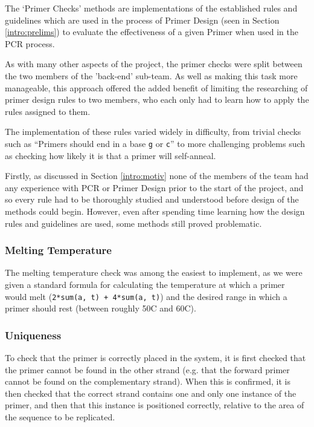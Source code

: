 The `Primer Checks' methods are implementations of the established rules
and guidelines which are used in the process of Primer Design (seen in
Section \ref{intro:prelims}) to evaluate the effectiveness of a given 
Primer when used in the PCR process.

As with many other aspects of the project, the primer checks were split
between the two members of the 'back-end' sub-team. As well as making
this task more manageable, this approach offered the added benefit of
limiting the researching of primer design rules to two members, who each
only had to learn how to apply the rules assigned to them.

The implementation of these rules varied widely in difficulty, from
trivial checks such as ``Primers should end in a base \verb£g£ or \verb£c£'' 
to more challenging problems such as checking how likely it is that a primer  
will self-anneal.

Firstly, as discussed in Section \ref{intro:motiv} none of the members of 
the team had any experience with PCR or Primer Design prior to the start of 
the project, and so every rule had to be thoroughly studied and understood 
before design of the methods could begin. However, even after spending time 
learning how the design rules and guidelines are used, some methods still 
proved problematic.

\subsubsection{Melting Temperature}
The melting temperature check was among the easiest to implement, as we
were given a standard formula for calculating the temperature at which a 
primer would melt (\texttt{2*sum(a, t) + 4*sum(a, t)}) and the desired 
range in which a primer should rest (between roughly 50\degree C and 
60\degree C).

\subsubsection{Uniqueness}
To check that the primer is correctly placed in the system, it is first checked
that the primer cannot be found in the other strand (e.g. that the forward
primer cannot be found on the complementary strand). When this is confirmed,
it is then checked that the correct strand contains one and only one instance
of the primer, and then that this instance is positioned correctly, relative
to the area of the sequence to be replicated.

